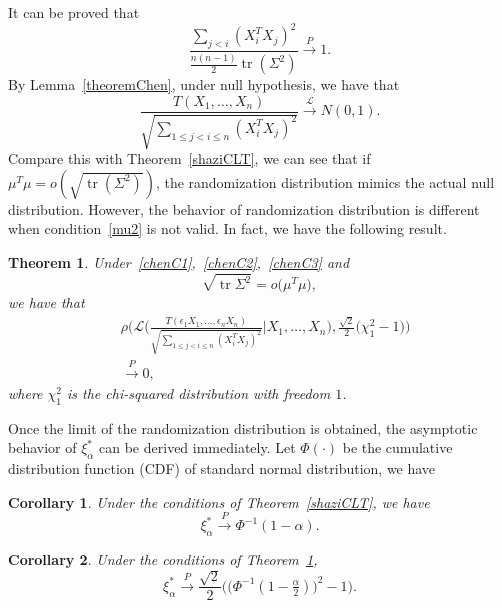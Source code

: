\documentclass[review]{elsarticle}
\DeclareMathOperator{\mytr}{tr}
\theoremstyle{plain}
\newtheorem{theorem}{\quad\quad Theorem}
\newtheorem{corollary}{\quad\quad Corollary}
\theoremstyle{definition}
\theoremstyle{remark}
\begin{document}
It can be proved that 
\begin{equation*}
\frac{\sum_{j<i}(X_i^T X_j)^2}{\frac{n(n-1)}{2}\mytr (\Sigma^2)}\xrightarrow{P}1.
\end{equation*}
By Lemma~\ref{theoremChen},  under null hypothesis, we have that
\begin{equation*}
\frac{T(X_1,\ldots, X_n)}{\sqrt{\sum_{1\leq j<i\leq n}{(X_i^T X_j)}^2}}\xrightarrow{\mathcal{L}}N(0,1).
\end{equation*}
Compare this with Theorem~\ref{shaziCLT}, we can see that if $\mu^T \mu=o(\sqrt{\mytr (\Sigma^2)})$,  the randomization distribution mimics the actual null distribution.
However, the behavior of randomization distribution is different when condition~\eqref{mu2} is not valid.
In fact, we have the following result.
\begin{theorem}\label{farT}
    Under~\eqref{chenC1},~\eqref{chenC2},~\eqref{chenC3} and
    \begin{equation}\label{mu3}
       \sqrt{\mytr {\Sigma}^2} =o\big(\mu^T\mu\big),
    \end{equation}
    we have that
    \begin{equation*}
        \begin{aligned}
            &\rho\bigg(\mathcal{L}\bigg(\frac{T(\epsilon_1 X_1,\ldots,\epsilon_n X_n)}{\sqrt{\sum_{1\leq j<i\leq n}{(X_i^T X_j)}^2}}\bigg|X_1,\ldots,X_n\bigg),\frac{\sqrt{2}}{2}\big(\chi^2_1-1\big)\bigg)
            \\&\xrightarrow{P} 0,
        \end{aligned}
    \end{equation*}
            where $\chi^2_1$ is the chi-squared distribution with freedom $1$.
\end{theorem}

Once the limit of the randomization distribution is obtained, the asymptotic behavior of $\xi_{\alpha}^*$ can be derived immediately.
Let $\Phi(\cdot)$ be the cumulative distribution function (CDF) of standard normal distribution, we have
\begin{corollary}\label{corollaryQuan}
    Under the conditions of Theorem~\ref{shaziCLT}, we have
    \begin{equation*}
    \xi_{\alpha}^*\xrightarrow{P} \Phi^{-1}(1-\alpha).
    \end{equation*}
\end{corollary}

\begin{corollary}\label{corollaryQuan2}
    Under the conditions of Theorem~\ref{farT},
    \begin{equation*}
    \xi_{\alpha}^*\xrightarrow{P}\frac{\sqrt{2}}{2}\Big(\big(\Phi^{-1}(1-\tfrac{\alpha}{2})\big)^2-1\Big).
    \end{equation*}
\end{corollary}
\end{document}
